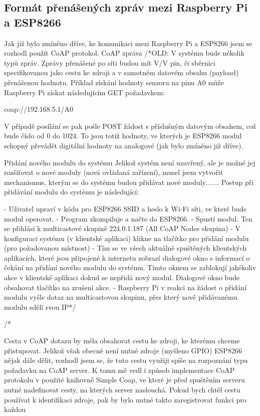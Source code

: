 \subsection*{Formát přenášených zpráv mezi Raspberry Pi a ESP8266}
Jak již bylo zmíněno dříve, ke komunikaci mezi Raspberry Pi a ESP8266 jsem se rozhodl použít CoAP protokol. CoAP zpráva 
/*OLD:
V systému bude několik typů zpráv.
Zprávy přenášené po síti budou mít V/V pin, či sběrnici specifikovanou jako cestu ke zdroji a v samotném datovém obsahu (payload) přenášenou hodnotu. Příklad získání hodnoty senzoru na pinu A0 může Raspberry Pi získat následujícím GET požadavkem:

coap://192.168.5.1/A0

V případě posílání se pak pošle POST žádost s příslušným datovým obsahem, což bude číslo od 0 do 1024. To jsou totiž hodnoty, ve kterých je ESP8266 modul schopný převádět digitální hodnoty na analogové (jak bylo zmíněno již dříve).

Přidání nového modulu do systému
Jelikož systém není uzavřený, ale je možné jej rozšiřovat o nové moduly (nová ovládaná zařízení), musel jsem vytvořit mechanismus, kterým se do systému budou přidávat nové moduly.......
Postup při přidávání modulu do systému je následující:

- Uživatel upraví v kódu pro ESP8266 SSID a heslo k Wi-Fi síti, ve které bude modul operovat.
- Program zkompiluje a načte do ESP8266.
- Spustí modul. Ten se přihlásí k multicastové skupině 224.0.1.187 (All CoAP Nodes skupina)
- V konfiguraci systému (v klientské aplikaci) klikne na tlačítko pro přidání modulu (pro požadovanou místnost)
- Tím se ve všech aktuálně spuštěných klientských aplikacích, které jsou připojené k internetu zobrazí dialogové okno s informací o čekání na přidání nového modulu do systému. Tímto oknem se zablokují jakékoliv akce v klientské aplikaci dokud se nepřidá nový modul. Dialogové okno bude obsahovat tlačítko na zrušení akce.
- Raspberry Pi v reakci na žádost o přidání modulu vyšle dotaz na multicastovou skupinu, přes který nově přidávanému modulu sdělí svou IP*/


/*


Cesta v CoAP dotazu by měla obsahovat cestu ke zdroji, ke kterému chceme přistupovat. Jelikož však obecně není nutné zdroje (myšleno GPIO) ESP8266 nějak dále dělit, rozhodl jsem se, že tuto cestu využiji spíše na rozpoznání typu požadavku na CoAP server. K tomu mě vedl i způsob implementace CoAP protokolu v použité knihovně Simple Coap, ve které je před spuštěním serveru nutné nadefinovat cesty, na kterých server naslouchá. Pokud bych chtěl cestu používat k identifikaci zdroje, pak by bylo nutné takto zaregistrovat funkci pro každou

